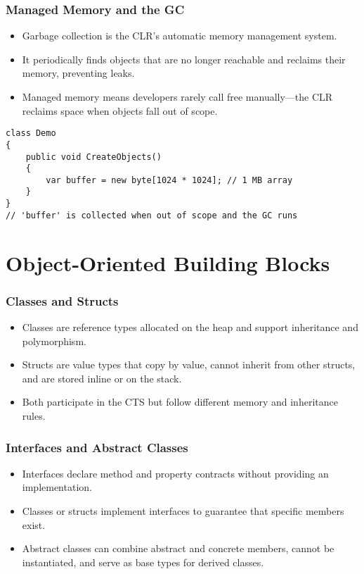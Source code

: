 \documentclass[aspectratio=169]{beamer}
\newcommand{\ProgressStep}[1]{\progressstep{#1}}
\newcommand{\ThisFrameTitle}[1]{\frametitle{#1}}
\begin{document}
\begin{frame}[fragile]
  \ProgressStep{5}\ThisFrameTitle{Managed Memory and the GC}
  \begin{itemize}
    \item Garbage collection is the CLR’s automatic memory management system.
    \item It periodically finds objects that are no longer reachable and reclaims their memory, preventing leaks.
    \item Managed memory means developers rarely call free manually—the CLR reclaims space when objects fall out of scope.
  \end{itemize}
  \vspace{0.6em}
  \begin{verbatim}
class Demo
{
    public void CreateObjects()
    {
        var buffer = new byte[1024 * 1024]; // 1 MB array
    }
}
// 'buffer' is collected when out of scope and the GC runs
  \end{verbatim}
\end{frame}

\section{Object-Oriented Building Blocks}
\begin{frame}
  \ProgressStep{6}\ThisFrameTitle{Classes and Structs}
  \begin{itemize}
    \item Classes are reference types allocated on the heap and support inheritance and polymorphism.
    \item Structs are value types that copy by value, cannot inherit from other structs, and are stored inline or on the stack.
    \item Both participate in the CTS but follow different memory and inheritance rules.
  \end{itemize}
\end{frame}

\begin{frame}
  \ProgressStep{7}\ThisFrameTitle{Interfaces and Abstract Classes}
  \begin{itemize}
    \item Interfaces declare method and property contracts without providing an implementation.
    \item Classes or structs implement interfaces to guarantee that specific members exist.
    \item Abstract classes can combine abstract and concrete members, cannot be instantiated, and serve as base types for derived classes.
  \end{itemize}
\end{frame}
\end{document}
